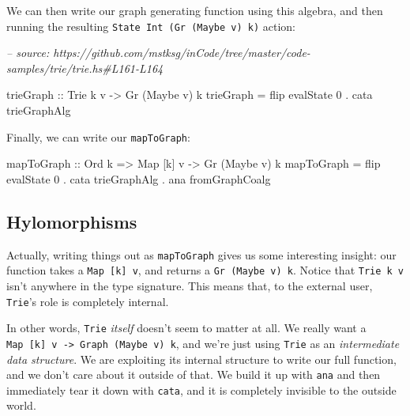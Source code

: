 \documentclass[]{article}
\newenvironment{Shaded}{}{}
\newcommand{\CommentTok}[1]{\textcolor[rgb]{0.38,0.63,0.69}{\textit{#1}}}
\newcommand{\DataTypeTok}[1]{\textcolor[rgb]{0.56,0.13,0.00}{#1}}
\newcommand{\DecValTok}[1]{\textcolor[rgb]{0.25,0.63,0.44}{#1}}
\newcommand{\FunctionTok}[1]{\textcolor[rgb]{0.02,0.16,0.49}{#1}}
\newcommand{\NormalTok}[1]{#1}
\newcommand{\OtherTok}[1]{\textcolor[rgb]{0.00,0.44,0.13}{#1}}
\begin{document}
We can then write our graph generating function using this algebra, and then
running the resulting \texttt{State\ Int\ (Gr\ (Maybe\ v)\ k)} action:

\begin{Shaded}
\begin{Highlighting}[]
\CommentTok{-- source: https://github.com/mstksg/inCode/tree/master/code-samples/trie/trie.hs#L161-L164}

\NormalTok{trieGraph}
\OtherTok{    ::} \DataTypeTok{Trie}\NormalTok{ k v}
    \OtherTok{->} \DataTypeTok{Gr}\NormalTok{ (}\DataTypeTok{Maybe}\NormalTok{ v) k}
\NormalTok{trieGraph }\FunctionTok{=}\NormalTok{ flip evalState }\DecValTok{0} \FunctionTok{.}\NormalTok{ cata trieGraphAlg}
\end{Highlighting}
\end{Shaded}

Finally, we can write our \texttt{mapToGraph}:

\begin{Shaded}
\begin{Highlighting}[]
\NormalTok{mapToGraph}
\OtherTok{    ::} \DataTypeTok{Ord}\NormalTok{ k}
    \OtherTok{=>} \DataTypeTok{Map}\NormalTok{ [k] v}
    \OtherTok{->} \DataTypeTok{Gr}\NormalTok{ (}\DataTypeTok{Maybe}\NormalTok{ v) k}
\NormalTok{mapToGraph }\FunctionTok{=}\NormalTok{ flip evalState }\DecValTok{0}
           \FunctionTok{.}\NormalTok{ cata trieGraphAlg}
           \FunctionTok{.}\NormalTok{ ana fromGraphCoalg}
\end{Highlighting}
\end{Shaded}

\hypertarget{hylomorphisms}{%
\subsection{Hylomorphisms}\label{hylomorphisms}}

Actually, writing things out as \texttt{mapToGraph} gives us some interesting
insight: our function takes a \texttt{Map\ {[}k{]}\ v}, and returns a
\texttt{Gr\ (Maybe\ v)\ k}. Notice that \texttt{Trie\ k\ v} isn't anywhere in
the type signature. This means that, to the external user, \texttt{Trie}'s role
is completely internal.

In other words, \texttt{Trie} \emph{itself} doesn't seem to matter at all. We
really want a \texttt{Map\ {[}k{]}\ v\ -\textgreater{}\ Graph\ (Maybe\ v)\ k},
and we're just using \texttt{Trie} as an \emph{intermediate data structure}. We
are exploiting its internal structure to write our full function, and we don't
care about it outside of that. We build it up with \texttt{ana} and then
immediately tear it down with \texttt{cata}, and it is completely invisible to
the outside world.
\end{document}

